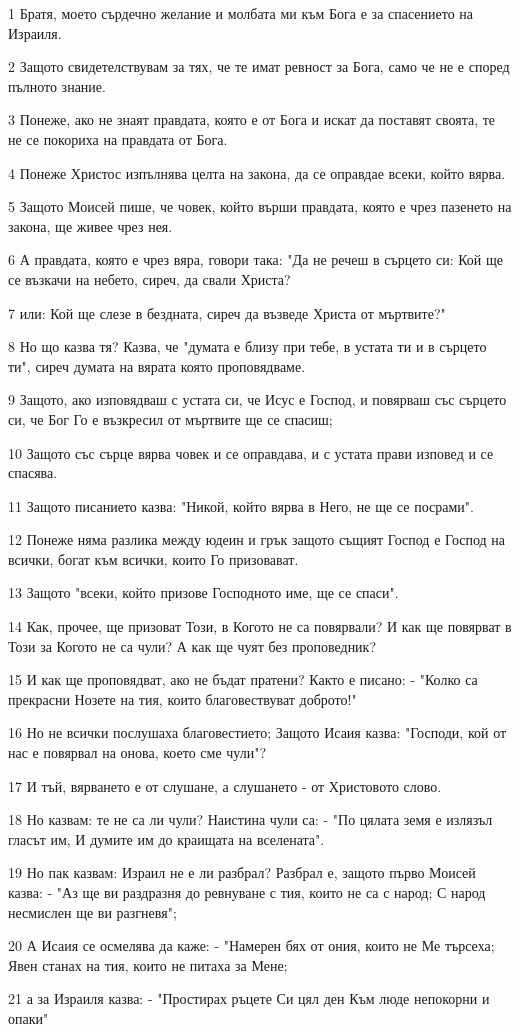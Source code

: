 \par 1 Братя, моето сърдечно желание и молбата ми към Бога е за спасението на Израиля.
\par 2 Защото свидетелствувам за тях, че те имат ревност за Бога, само че не е според пълното знание.
\par 3 Понеже, ако не знаят правдата, която е от Бога и искат да поставят своята, те не се покориха на правдата от Бога.
\par 4 Понеже Христос изпълнява целта на закона, да се оправдае всеки, който вярва.
\par 5 Защото Моисей пише, че човек, който върши правдата, която е чрез пазенето на закона, ще живее чрез нея.
\par 6 А правдата, която е чрез вяра, говори така: "Да не речеш в сърцето си: Кой ще се възкачи на небето, сиреч, да свали Христа?
\par 7 или: Кой ще слезе в бездната, сиреч да възведе Христа от мъртвите?"
\par 8 Но що казва тя? Казва, че "думата е близу при тебе, в устата ти и в сърцето ти", сиреч думата на вярата която проповядваме.
\par 9 Защото, ако изповядваш с устата си, че Исус е Господ, и повярваш със сърцето си, че Бог Го е възкресил от мъртвите ще се спасиш;
\par 10 Защото със сърце вярва човек и се оправдава, и с устата прави изповед и се спасява.
\par 11 Защото писанието казва: "Никой, който вярва в Него, не ще се посрами".
\par 12 Понеже няма разлика между юдеин и грък защото същият Господ е Господ на всички, богат към всички, които Го призовават.
\par 13 Защото "всеки, който призове Господното име, ще се спаси".
\par 14 Как, прочее, ще призоват Този, в Когото не са повярвали? И как ще повярват в Този за Когото не са чули? А как ще чуят без проповедник?
\par 15 И как ще проповядват, ако не бъдат пратени? Както е писано: - "Колко са прекрасни Нозете на тия, които благовествуват доброто!"
\par 16 Но не всички послушаха благовестието; Защото Исаия казва: "Господи, кой от нас е повярвал на онова, което сме чули"?
\par 17 И тъй, вярването е от слушане, а слушането - от Христовото слово.
\par 18 Но казвам: те не са ли чули? Наистина чули са: - "По цялата земя е излязъл гласът им, И думите им до краищата на вселената".
\par 19 Но пак казвам: Израил не е ли разбрал? Разбрал е, защото първо Моисей казва: - "Аз ще ви раздразня до ревнуване с тия, които не са с народ; С народ несмислен ще ви разгневя";
\par 20 А Исаия се осмелява да каже: - "Намерен бях от ония, които не Ме търсеха; Явен станах на тия, които не питаха за Мене;
\par 21 а за Израиля казва: - "Простирах ръцете Си цял ден Към люде непокорни и опаки"

